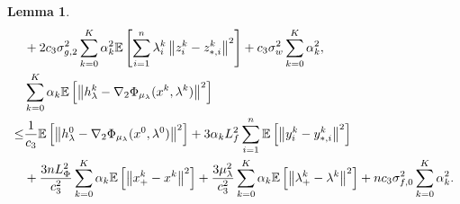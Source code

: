 \documentclass[10pt]{article}
\newtheorem{lemma}{Lemma}[section]
\theoremstyle{remark}
\newcommand{\E}{\mathbb{E}}
\newcommand{\norm}[1]{\left\|#1\right\|}
\begin{document}
\begin{lemma}
\begin{align}
        & + 2c_3\sigma_{g,2}^2\sum_{k=0}^{K}\alpha_k^2\E\left[\sum_{i=1}^{n}\lambda_i^k\norm{z_i^k - z_{*,i}^k}^2\right] + c_3\sigma_w^2\sum_{k=0}^{K}\alpha_k^2, \notag\\
        &\sum_{k=0}^{K}\alpha_k\E\left[\norm{h_{\lambda}^k - \nabla_2\Phi_{\mu_{\lambda}}(x^k, \lambda^k)}^2\right] \notag\\
        \leq &\frac{1}{c_3}\E\left[\norm{h_{\lambda}^0 - \nabla_2\Phi_{\mu_{\lambda}}(x^0, \lambda^0)}^2\right] + 3\alpha_kL_f^2\sum_{i=1}^{n}\E\left[\norm{y_i^k - y_{*,i}^k}^2\right] \notag\\
        & + \frac{3nL_{\Phi}^2}{c_3^2}\sum_{k=0}^{K}\alpha_k\E\left[\norm{x_+^k - x^k}^2\right]  + \frac{3\mu_{\lambda}^2}{c_3^2}\sum_{k=0}^{K}\alpha_k\E\left[\norm{\lambda_+^k - \lambda^k}^2\right] + nc_3\sigma_{f,0}^2\sum_{k=0}^{K}\alpha_k^2.\label{ineq: dual_decrease}
    \end{align}
\end{lemma}
\end{document}
